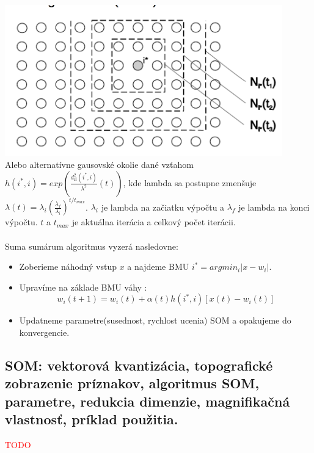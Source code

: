 \documentclass{article}
\numberwithin{equation}{section} %
\begin{document}
\includegraphics[width=12cm]{imgs/rect_neighb}\\
Alebo alternatívne gausovské okolie dané vzťahom $h(i^*, i) = exp(\frac{d^2_E(i^*, i)}{\lambda^2}(t))$, kde lambda sa postupne zmenšuje $\lambda(t) = \lambda_i(\frac{\lambda_f}{\lambda_i})^{t/t_{max}}$. $\lambda_i$ je lambda na začiatku výpočtu a $\lambda_f$ je lambda na konci výpočtu. $t$ a $t_{max}$ je aktuálna iterácia a celkový počet iterácii.
\\\\
Suma sumárum algoritmus vyzerá nasledovne:
\begin{itemize}
\item Zoberieme náhodný vstup $x$ a najdeme BMU $i^* = arg min_i |x - w_i|$.
\item Upravíme na základe BMU váhy : $$ w_i(t+1) = w_i(t) + \alpha(t)h(i^*,i)[x(t) - w_i(t)] $$
\item Updatneme parametre(susednost, rychlost ucenia) SOM a opakujeme do konvergencie.
\end{itemize}
\subsection{SOM: vektorová kvantizácia, topografické zobrazenie príznakov, algoritmus SOM, parametre, redukcia dimenzie, magnifikačná vlastnosť, príklad použitia.}
\textcolor{red}{TODO}
\end{document}
